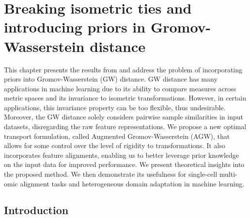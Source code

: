 
\chapter[Breaking isometric ties and introducing priors in Gromov-Wasserstein distance]{Breaking isometric ties and introducing priors in Gromov-Wasserstein distance}
\label{chap:agw}

\renewcommand{\contentsname}{Contents}
\localtableofcontents*
{}

\hfill \break

\raggedbottom

This chapter presents the results from \citep{Demetci23} and address the problem of
incorporating priors into Gromov-Wasserstein (GW) distance.
GW distance has many applications in machine learning due to its ability
to compare measures across metric spaces and its invariance to isometric transformations. However,
in certain applications, this invariance property can be too flexible, thus undesirable. Moreover,
the GW distance solely considers pairwise sample similarities in input datasets,
disregarding the raw feature representations. We propose a new optimal transport formulation,
called Augmented Gromov-Wasserstein (AGW), that allows for some control over the
level of rigidity to transformations. It also incorporates feature alignments,
enabling us to better leverage prior knowledge on the input data for improved performance.
We present theoretical insights into the proposed method. We then demonstrate its usefulness
for single-cell multi-omic alignment tasks and heterogeneous domain adaptation in machine learning.


\raggedbottom

\section{Introduction}

